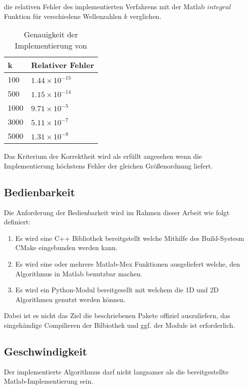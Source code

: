 die relativen Fehler des implementierten Verfahrens mit der Matlab $integral$ Funktion für verschiedene Wellenzahlen $k$ verglichen.
\begin{table}[ht]
    \centering
    \begin{tabular}{|l|l|}
    \hline
    k & Relativer Fehler \\ 
    \hline \hline
    100  & $1.44 × 10^{-15}$ \\
    500  &  $1.15 × 10^{-14}$ \\
    1000 &  $9.71 × 10^{-5}$ \\
    3000 &  $5.11 × 10^{-7}$ \\
    5000 & $1.31 × 10^{-8}$ \\  \hline
    \end{tabular}    
    \caption{Genauigkeit der Implementierung von \cite*[]{gasperini:hal-03209144}}
\end{table} 
Das Kriterium der Korrektheit wird als erfüllt angesehen wenn die Implementierung höchstens Fehler der gleichen Größenordnung liefert.

\pagebreak

\subsection{Bedienbarkeit}

Die Anforderung der Bedienbarkeit wird im Rahmen dieser Arbeit wie folgt definiert:

\begin{enumerate}
    \item Es wird eine C++ Bibliothek bereitgstellt welche Mithilfe des Build-Systesm CMake eingebunden werden kann. 
    \item Es wird eine oder mehrere Matlab-Mex Funktionen ausgeliefert welche, den Algorithmus in Matlab benutzbar machen. 
    \item Es wird ein Python-Modul bereitgesellt mit welchem die 1D und 2D Algorithmen genutzt werden können.
\end{enumerate}

Dabei ist es nicht das Ziel die beschriebenen Pakete offiziel auszuliefern, das eingehändige Compilieren der Bilbiothek und ggf. der Module ist erforderlich.

\subsection{Geschwindigkeit}

Der implementierte Algorithmus darf nicht langsamer als die bereitgestellte Matlab-Implementierung sein.


